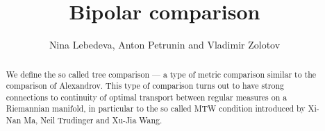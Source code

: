 \documentclass{article}
\begin{document}
\title{Bipolar comparison}
\author{Nina Lebedeva, Anton Petrunin and Vladimir Zolotov}



\newcommand{\Addresses}{{\bigskip\footnotesize

  Nina Lebedeva, \par\nopagebreak
  \textsc{Steklov Institute,
27 Fontanka, St. Petersburg, 
191023, Russia.}
  \par\nopagebreak\textsc{Math. Dept.
St. Petersburg State University,
Universitetsky pr., 28, 
Stary Peterhof, 
198504, Russia.}
  \par\nopagebreak
  \textit{Email}: \texttt{lebed@pdmi.ras.ru}

\medskip

  Anton Petrunin, \par\nopagebreak\textsc{Math. Dept. PSU, University Park, PA 16802, USA}
  \par\nopagebreak
  \textit{Email}: \texttt{petrunin@math.psu.edu}
  
\medskip

Vladimir Zolotov, \par\nopagebreak\textsc{Steklov Institute,
27 Fontanka, St. Petersburg, 
191023, Russia.}
  \par\nopagebreak
  \textsc{Math. Dept.
St. Petersburg State University,
Universitetsky pr., 28, 
Stary Peterhof, 
198504, Russia.}
  \par\nopagebreak
  \textit{Email}: \texttt{paranuel@mail.ru}
}}

\date{}

\maketitle

\begin{abstract}
We define the so called tree comparison --- a type of metric comparison similar to the comparison of Alexandrov.
This type of comparison turns out to have strong connections to continuity of optimal transport between regular measures on a Riemannian manifold, in particular to the so called MTW condition introduced by Xi-Nan Ma, Neil Trudinger and Xu-Jia Wang.

\end{abstract}
\end{document}
